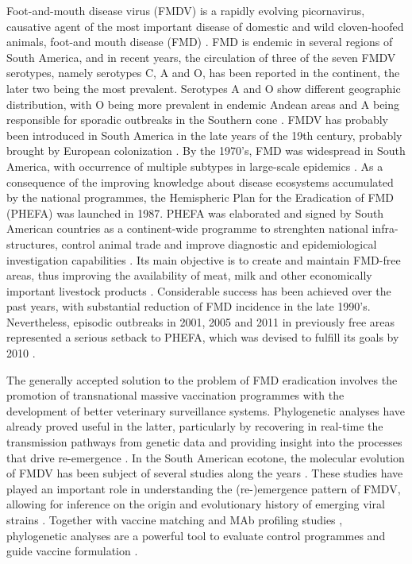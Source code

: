 \documentclass[10pt]{article}
\begin{document}
Foot-and-mouth disease virus (FMDV) is a rapidly evolving picornavirus, causative agent of the most important disease of domestic and wild cloven-hoofed animals, foot-and mouth disease (FMD) \cite{review}.
FMD is endemic in several regions of South America, and in recent years, the circulation of three of the seven FMDV serotypes, namely serotypes C, A and O, has been reported in the continent, the later two being the most prevalent.
Serotypes A and O show different  geographic distribution, with O being more prevalent in endemic Andean areas \cite{andean} and A being responsible for sporadic outbreaks in the Southern cone \cite{Perez2001,Malirat2012}.
FMDV has probably been introduced in South America in the late years of the 19th century, probably brought by European colonization \cite{tully}. 
By the 1970's, FMD was widespread in South America, with occurrence of multiple subtypes in large-scale epidemics \cite{Saraiva2003}.
As a consequence of the improving knowledge about disease ecosystems accumulated by the national programmes, the Hemispheric Plan for the Eradication of FMD (PHEFA) was launched in 1987.
PHEFA was elaborated and signed by South American countries as a continent-wide programme to strenghten national infra-structures, control animal trade and improve diagnostic and epidemiological investigation capabilities \cite{review_eradication}.
Its main objective is to create and maintain FMD-free areas, thus improving the availability of meat, milk and other economically important livestock products \cite{Saraiva2003,Saraiva2004,review_eradication,combining}. Considerable success has been achieved over the past years, with substantial reduction of FMD incidence in the late 1990's.
Nevertheless, episodic outbreaks in 2001, 2005 and 2011 in previously free areas represented a serious setback to PHEFA, which was devised to fulfill its goals by 2010 \cite{Saraiva2003,Saraiva2004}.

The generally accepted solution to the problem of FMD eradication involves the promotion of transnational massive vaccination programmes \cite{vaccinationSA}
with the development of better veterinary surveillance systems. Phylogenetic analyses have already proved useful in the latter, particularly by recovering in real-time the transmission pathways from genetic data \cite{cottam2008} and providing insight into the processes that drive re-emergence \cite{combining}.
In the South American ecotone, the molecular evolution of FMDV has been subject of several studies along the years \cite{Perez2001,Malirat2007,andean,Malirat2011,Maradei2013}.
These studies have played an important role in understanding the (re-)emergence pattern of FMDV, allowing for inference on the origin and evolutionary history of emerging viral strains \cite{topotypes,Perez2001}. Together with vaccine matching and MAb profiling studies \cite{Maradei2011}, phylogenetic analyses are a powerful 
tool to evaluate control programmes and guide vaccine formulation \cite{Maradei2011,Maradei2013}.
\end{document}
